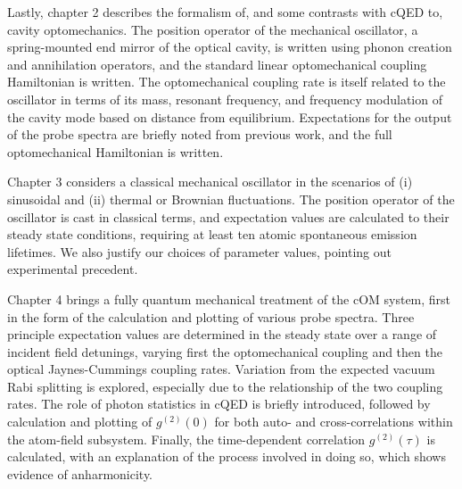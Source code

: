 Lastly, chapter 2 describes the formalism of, and some contrasts with cQED to, cavity optomechanics. The position operator of the mechanical oscillator, a spring-mounted end mirror of the optical cavity, is written using phonon creation and annihilation operators, and the standard linear optomechanical coupling Hamiltonian is written. The optomechanical coupling rate is itself related to the oscillator in terms of its mass, resonant frequency, and frequency modulation of the cavity mode based on distance from equilibrium. Expectations for the output of the probe spectra are briefly noted from previous work, and the full optomechanical Hamiltonian is written.

Chapter 3 considers a classical mechanical oscillator in the scenarios of (i) sinusoidal and (ii) thermal or Brownian fluctuations. The position operator of the oscillator is cast in classical terms, and expectation values are calculated to their steady state conditions, requiring at least ten atomic spontaneous emission lifetimes. We also justify our choices of parameter values, pointing out experimental precedent.

Chapter 4 brings a fully quantum mechanical treatment of the cOM system, first in the form of the calculation and plotting of various probe spectra. Three principle expectation values are determined in the steady state over a range of incident field detunings, varying first the optomechanical coupling and then the optical Jaynes-Cummings coupling rates. Variation from the expected vacuum Rabi splitting is explored, especially due to the relationship of the two coupling rates. The role of photon statistics in cQED is briefly introduced, followed by calculation and plotting of $g^{(2)}(0)$ for both auto- and cross-correlations within the atom-field subsystem. Finally, the time-dependent correlation $g^{(2)}(\tau)$ is calculated, with an explanation of the process involved in doing so, which shows evidence of anharmonicity.


